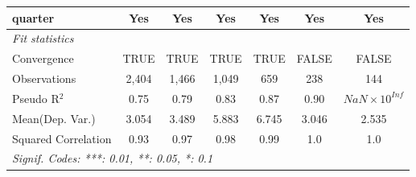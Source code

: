 \begin{tabular}{lcccccc}
   quarter                                                    & Yes          & Yes           & Yes           & Yes         & Yes            & Yes\\  
   \midrule
   \emph{Fit statistics}\\
   Convergence                                                &TRUE          & TRUE          & TRUE          & TRUE        & FALSE          & FALSE\\  
   Observations                                               & 2,404        & 1,466         & 1,049         & 659         & 238            & 144\\  
   Pseudo R$^2$                                               & 0.75         & 0.79          & 0.83          & 0.87        & 0.90           & $NaN\times 10^{Inf}$\\   
Mean(Dep. Var.) & 3.054 & 3.489 & 5.883 & 6.745 & 3.046 & 2.535 \\
   Squared Correlation                                        & 0.93         & 0.97          & 0.98          & 0.99        & 1.0            & 1.0\\  
   \midrule \midrule
   \multicolumn{7}{l}{\emph{Signif. Codes: ***: 0.01, **: 0.05, *: 0.1}}\\
\end{tabular}
\par\endgroup
